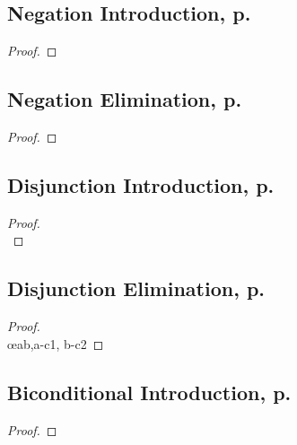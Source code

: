 \begin{multicols}{2}
\subsection{Negation Introduction, p.\ \pageref{negint}}

\begin{proof}
\open
\close
{}
\end{proof}


\subsection{Negation Elimination, p.\ \pageref{negelim}}
\begin{proof}
\open
\close
{}
\end{proof}





\subsection{Disjunction Introduction, p.\ \pageref{disjint}}

\begin{proof}

\\	
\end{proof}

\subsection{Disjunction Elimination, p.\ \pageref{disjelim}}
\begin{proof}
\\	\open
	\close
	\open
	\close
	 \oe{ab,a-c1, b-c2}
\end{proof}



\subsection{Biconditional Introduction, p.\ \pageref{biint}}
\begin{proof}
	\open
	\close
	\open
	\close
\end{proof}


\end{multicols}
